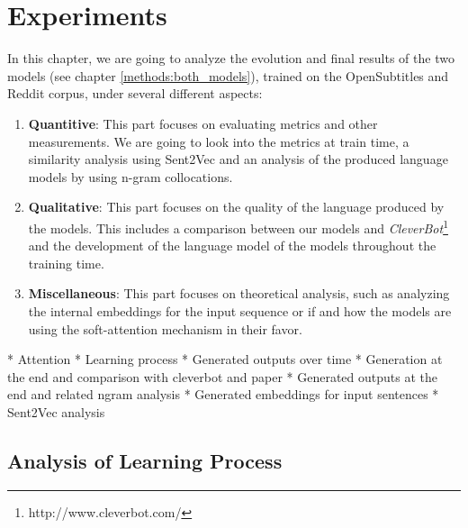 \chapter{Experiments}
In this chapter, we are going to analyze the evolution and final results of the two models (see chapter \ref{methods:both_models}), trained on the OpenSubtitles and Reddit corpus, under several different aspects:

\begin{enumerate}[noitemsep]
	\item \textbf{Quantitive}: This part focuses on evaluating metrics and other measurements. We are going to look into the metrics at train time, a similarity analysis using Sent2Vec and an analysis of the produced language models by using n-gram collocations.
	\item \textbf{Qualitative}: This part focuses on the quality of the language produced by the models. This includes a comparison between our models and \emph{CleverBot}\footnote{http://www.cleverbot.com/} and the development of the language model of the models throughout the training time.
	\item \textbf{Miscellaneous}: This part focuses on theoretical analysis, such as analyzing the internal embeddings for the input sequence or if and how the models are using the soft-attention mechanism in their favor.
\end{enumerate}
\blindtext

* Attention
* Learning process
* Generated outputs over time
* Generation at the end and comparison with cleverbot and paper
* Generated outputs at the end and related ngram analysis
* Generated embeddings for input sentences
* Sent2Vec analysis


\section{Analysis of Learning Process}
\blindtext

